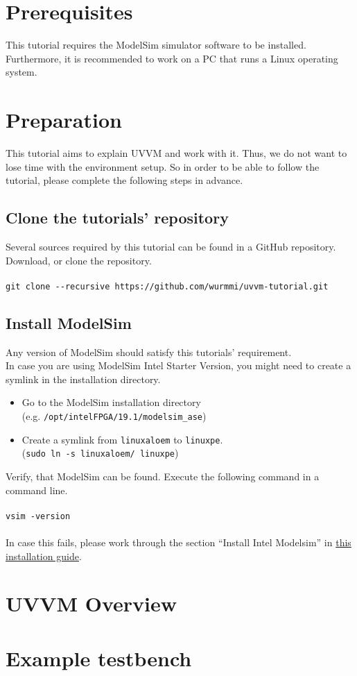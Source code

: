 \section{Prerequisites}

This tutorial requires the ModelSim simulator software to be installed.
Furthermore, it is recommended to work on a PC that runs a Linux operating system.

\section{Preparation}

This tutorial aims to explain UVVM and work with it.
Thus, we do not want to lose time with the environment setup.
So in order to be able to follow the tutorial, please complete the
following steps in advance.

\subsection{Clone the tutorials' repository}

Several sources required by this tutorial can be found in a GitHub repository.\\
Download, or clone the repository.\\
\\
\texttt{git clone -{}-recursive https://github.com/wurmmi/uvvm-tutorial.git }

\subsection{Install ModelSim}

Any version of ModelSim should satisfy this tutorials' requirement.\\

In case you are using ModelSim Intel Starter Version, you might need to
create a symlink in the installation directory.
\begin{itemize}
      \item Go to the ModelSim installation directory\\
            (e.g. \texttt{/opt/intelFPGA/19.1/modelsim\_ase})
      \item Create a symlink from \texttt{linuxaloem} to \texttt{linuxpe}.\\
            (\texttt{sudo ln -s linuxaloem/ linuxpe})
\end{itemize}

Verify, that ModelSim can be found. Execute the following command in a command line.\\
\\
\texttt{vsim -version}\\
\\
In case this fails, please work through the section ``Install Intel Modelsim''
in \href{../install-modelsim-on-ubuntu.pdf}{this installation guide}.


\section{UVVM Overview}

\section{Example testbench}
